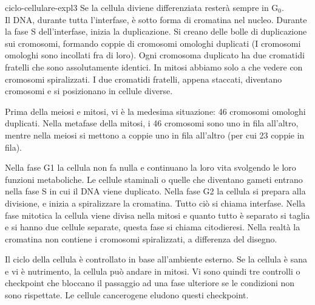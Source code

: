 \documentclass[preview]{standalone}
\begin{document}
\begin{snippet}{ciclo-cellulare-expl3}
    Se la cellula diviene differenziata resterà sempre in G\({}_0\).
    \\
    Il DNA, durante tutta l'interfase, è sotto forma di cromatina nel nucleo.
    Durante la fase S dell'interfase, inizia la duplicazione.
    Si creano delle bolle di duplicazione sui cromosomi, formando
    coppie di cromosomi omologhi duplicati (I cromosomi omologhi sono incollati fra di loro).
    Ogni cromosoma duplicato ha due cromatidi fratelli che sono assolutamente identici.
    In mitosi abbiamo solo a che vedere con cromosomi spiralizzati.
    I due cromatidi fratelli, appena staccati, diventano cromosomi e si posizionano in cellule diverse.

    Prima della meiosi e mitosi, vi è la medesima situazione: 46 cromosomi omologhi duplicati.
    Nella metafase della mitosi, i 46 cromosomi sono uno in fila all'altro,
    mentre nella meiosi si mettono a coppie uno in fila all'altro (per cui 23 coppie in fila).

    Nella fase G1 la cellula non fa nulla e continuano la loro vita svolgendo le loro funzioni metaboliche. 
    Le cellule staminali o quelle che diventano gameti entrano nella fase S in cui il DNA viene duplicato. 
    Nella fase G2 la cellula si prepara alla divisione, e inizia a spiralizzare la cromatina. 
    Tutto ciò si chiama interfase.
    Nella fase mitotica la cellula viene divisa nella mitosi e quanto tutto è separato si taglia e si hanno due cellule separate, questa fase si chiama citodieresi.
    Nella realtà la cromatina non contiene i cromosomi spiralizzati, a differenza del disegno.

    Il ciclo della cellula è controllato in base all'ambiente esterno.
    Se la cellula è sana e vi è nutrimento, la cellula può andare in mitosi.
    Vi sono quindi tre controlli o checkpoint che bloccano il passaggio ad una fase ulteriore
    se le condizioni non sono rispettate.
    Le cellule cancerogene eludono questi checkpoint.
\end{snippet}

\end{document}

